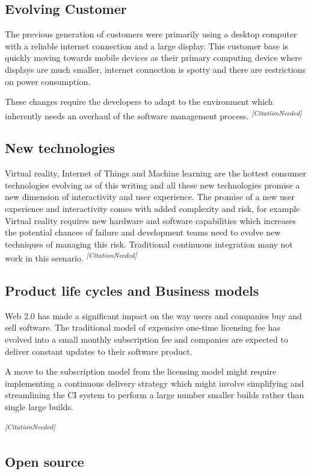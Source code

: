 \documentclass[10pt,conference]{IEEEtran}
\newcommand{\citationneeded}{\textsuperscript{\textit{[CitationNeeded]}}}
\begin{document}
\subsection*{Evolving Customer}
The previous generation of customers were primarily using a desktop computer with a reliable internet connection and a large display. This customer base is quickly moving towards mobile devices as their primary computing device where displays are much smaller, internet connection is spotty and there are restrictions on power consumption. 

These changes require the developers to adapt to the environment which inherently needs an overhaul of the software management process. \citationneeded


\subsection*{New technologies}

Virtual reality, Internet of Things and Machine learning are the hottest consumer technologies evolving as of this writing and all these new technologies promise a new dimension of interactivity and user experience. The promise of a new user experience and interactivity comes with added complexity and risk, for example Virtual reality requires new hardware and software capabilities which increases the potential chances of failure and development teams need to evolve new techniques of managing this risk. Traditional continuous integration many not work in this scenario. \citationneeded

\subsection*{Product life cycles and Business models}

Web 2.0 has made a significant impact on the way users and companies buy and sell software. The traditional model of expensive one-time licensing fee has evolved into a small monthly subscription fee and companies are expected to deliver constant updates to their software product. 


A move to the subscription model from the licensing model might require implementing a continuous delivery strategy which might involve simplifying and streamlining the CI system to perform a large number smaller builds rather than single large builds.

\citationneeded

\subsection*{Open source}
\end{document}
